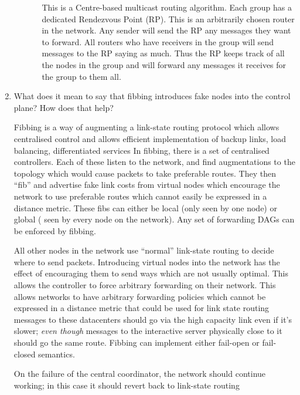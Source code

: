 \documentclass[10pt,\jkfside,a4paper]{article}
\begin{document}
\begin{enumerate}
\begin{itemize}
\begin{itemize}
            This is a Centre-based multicast routing algorithm. Each group has a dedicated Rendezvous Point (RP). This is an arbitrarily chosen router in the network. Any sender will send the RP any messages they
            want to forward. All routers who have receivers in the group will send messages to the RP saying as much. Thus the RP keeps track of all the nodes in the group and will forward any messages it
            receives for the group to them all.

        \end{itemize}

    \end{itemize}

    \item What does it mean to say that fibbing introduces fake nodes into the control plane? How does that help?

    Fibbing is a way of augmenting a link-state routing protocol which allows centralised control and allows efficient implementation of \ie backup links, load balancing, differentiated services \etc In fibbing,
    there is a set of centralised controllers. Each of these listen to the network, and find augmentations to the topology which would cause packets to take preferable routes. They then ``fib'' and advertise
    fake link costs from virtual nodes which encourage the network to use preferable routes which cannot easily be expressed in a distance metric. These fibs can either be local (only seen by one node) or global (
    seen by every node on the network). Any set of forwarding DAGs can be enforced by fibbing.

    All other nodes in the network use ``normal'' link-state routing to decide where to send packets. Introducing virtual nodes into the network has the effect of encouraging them to send ways which are not
    usually optimal. This allows the controller to force arbitrary forwarding on their network. This allows networks to have arbitrary forwarding policies which cannot be expressed in a distance metric that
    could be used for link state routing \ie messages to these datacenters should go via the high capacity link even if it's slower; \textit{even though} messages to the interactive server physically close to it
    should go the same route. Fibbing can implement either fail-open or fail-closed semantics.

    \begin{definition}

        On the failure of the central coordinator, the network should continue working; in this case it should revert back to link-state routing


\end{definition}
\end{enumerate}
\end{document}
